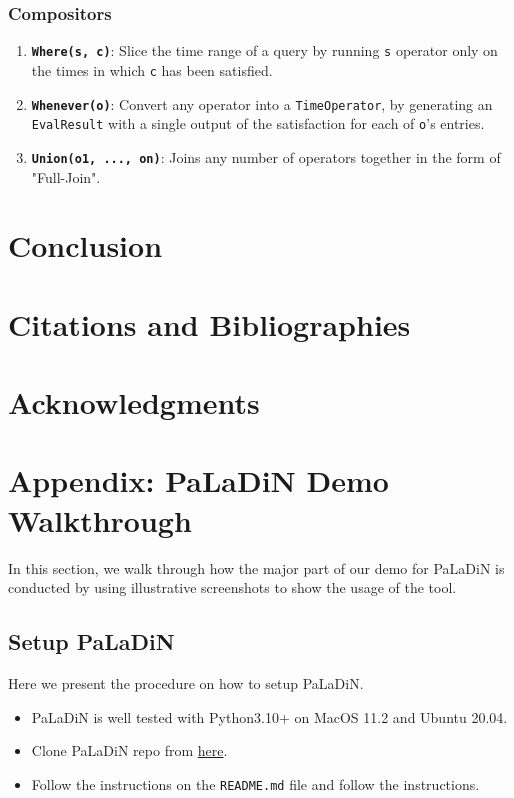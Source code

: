 \documentclass[sigconf,review]{acmart}
\begin{document}
    \subsubsection{Compositors}
    \begin{enumerate}
        \item \texttt{\textbf{Where(s, c)}}: Slice the time range of a query by running \texttt{s} operator only on the times in which \texttt{c} has been satisfied.
        \item \texttt{\textbf{Whenever(o)}}: Convert any operator into a \texttt{TimeOperator}, by generating an \texttt{EvalResult} with a single output of the satisfaction for each of \texttt{o}'s entries.
        \item \texttt{\textbf{Union(o1, ..., on)}}: Joins any number of operators together in the form of "Full-Join".
    \end{enumerate}


    \section{Conclusion}


    \section{Citations and Bibliographies}


    \section{Acknowledgments}

    \clearpage
    \appendix

    \section*{Appendix: PaLaDiN Demo Walkthrough}
    In this section, we walk through how the major part of our demo for PaLaDiN is conducted
    by using illustrative screenshots to show the usage of the tool.

    \subsection{Setup PaLaDiN}
    Here we present the procedure on how to setup PaLaDiN.

    \begin{itemize}
        \item PaLaDiN is well tested with Python3.10+ on MacOS 11.2 and Ubuntu 20.04.
        \item Clone PaLaDiN repo from \href{https://github.com/orenafek/paladin_engine/tree/demo}{here}.
        \item Follow the instructions on the \texttt{README.md} file and follow the instructions.
    \end{itemize}
\end{document}
